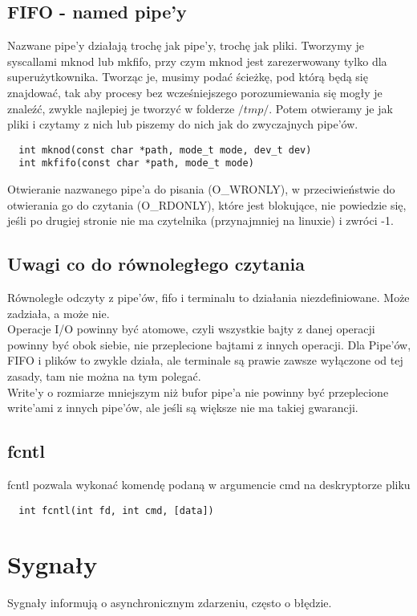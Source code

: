 \documentclass[12pt, a4paper, polish, openany]{book}
\begin{document}
\subsection{FIFO - named pipe'y}
Nazwane pipe'y działają trochę jak pipe'y, trochę jak pliki. Tworzymy je syscallami mknod lub mkfifo, przy czym mknod jest zarezerwowany tylko dla superużytkownika. Tworząc je, musimy podać ścieżkę, pod którą będą się znajdować, tak aby procesy bez wcześniejszego porozumiewania się mogły je znaleźć, zwykle najlepiej je tworzyć w folderze $/tmp/$. Potem otwieramy je jak pliki i czytamy z nich lub piszemy do nich jak do zwyczajnych pipe'ów.
\begin{verbatim}
  int mknod(const char *path, mode_t mode, dev_t dev)
  int mkfifo(const char *path, mode_t mode)
\end{verbatim}
Otwieranie nazwanego pipe'a do pisania (O\_WRONLY), w przeciwieństwie do otwierania go do czytania (O\_RDONLY), które jest blokujące, nie powiedzie się, jeśli po drugiej stronie nie ma czytelnika (przynajmniej na linuxie) i zwróci -1.
\subsection{Uwagi co do równoległego czytania}
Równoległe odczyty z pipe'ów, fifo i terminalu to działania niezdefiniowane. Może zadziała, a może nie.\\
Operacje I/O powinny być atomowe, czyli wszystkie bajty z danej operacji powinny być obok siebie, nie przeplecione bajtami z innych operacji. Dla Pipe'ów, FIFO i plików to zwykle działa, ale terminale są prawie zawsze wyłączone od tej zasady, tam nie można na tym polegać.\\
Write'y o rozmiarze mniejszym niż bufor pipe'a nie powinny być przeplecione write'ami z innych pipe'ów, ale jeśli są większe nie ma takiej gwarancji.
\subsection{fcntl}
fcntl pozwala wykonać komendę podaną w argumencie cmd na deskryptorze pliku
\begin{verbatim}
  int fcntl(int fd, int cmd, [data])
\end{verbatim}
\section{Sygnały}
Sygnały informują o asynchronicznym zdarzeniu, często o błędzie.
\end{document}
